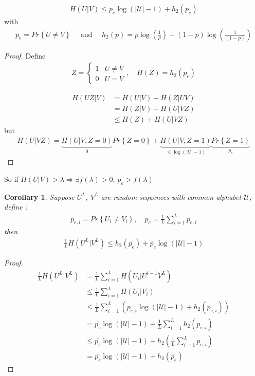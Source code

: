 \documentclass{article}
\newtheorem{corollary}{Corollary}[theorem]
\theoremstyle{definition} %
\renewcommand{\Pr}[1]{Pr\left\{#1\right\}}
\def\U{\mathcal{U}}
\begin{document}
\begin{align*}
  H(U | V) \leq p_e \log(|\U| - 1) + h_2(p_e)
\end{align*}
with
\begin{align*}
  p_e = \Pr{U \neq V} 
  \quad \text{ and } \quad
  h_2(p) = p \log(\frac{1}{p}) + (1 - p) \log(\frac{1}{(1-p)})
\end{align*}

\begin{proof}
  Define
  \begin{align*}
    Z =
    \left\{
    \begin{array}{ll}
      1 & U \neq V \\
      0 & U = V
    \end{array}
    \right. , \quad
    H(Z) = h_2(p_e)
  \end{align*}

  \begin{align*}
    H(UZ | V) &= H(U|V) + H(Z | UV) \\
    &= H(Z | V) + H(U | VZ) \\
    &\leq H(Z) + H(U | VZ) 
  \end{align*}
  but
  \begin{align*}
    H(U | VZ) = \underbrace{H(U | V, Z = 0)}_{0}\Pr{Z = 0} + \underbrace{H(U | V, Z = 1)}_{\leq \log(|\U| - 1)}\underbrace{\Pr{Z = 1}}_{p_e}
  \end{align*}
\end{proof}

So if $H(U|V) > \lambda \Rightarrow \exists f(\lambda) > 0$, $p_e > f(\lambda)$ 

\begin{corollary}
  Suppose $U^L$, $V^L$ are random sequences with common alphabet $\U$, define :
  \begin{align*}
    p_{e,i} = \Pr{U_i \neq V_i} , \quad 
    \bar{p_e} = \frac{1}{L} \sum_{i = 1}^{L} p_{e,i}
  \end{align*}
  then
  \begin{align*}
    \frac{1}{L} H(U^L | V^L) \leq h_2(\bar{p_e}) + \bar{p_e} \log(|\U| - 1)
  \end{align*}
\end{corollary}

\begin{proof}
  \begin{align*}
    \frac{1}{L} H(U^L | V^L) &= \frac{1}{L} \sum_{i = 1}^{L} H(U_i | U^{i-1} V^L) \\
    &\leq \frac{1}{L} \sum_{i = 1}^{L} H(U_i | V_i) \\
    &\leq \frac{1}{L} \sum_{i = 1}^{L}(p_{e,i} \log(|\U| - 1) + h_2(p_{e, i})) \\
    &= \bar{p_e} \log(|\U| - 1) + \frac{1}{L} \sum_{i = 1}^L h_2(p_{e,i}) \\
    &\leq \bar{p_e} \log(|\U| - 1) + h_2(\frac{1}{L} \sum_{i = 1}^L p_{e,i}) \\
    &= \bar{p_e} \log(|\U| - 1) + h_2(\bar{p_e})
  \end{align*}
\end{proof}
\end{document}
